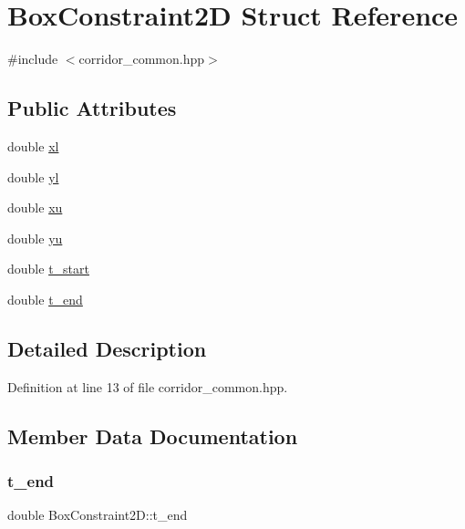 \hypertarget{struct_box_constraint2_d}{}\section{Box\+Constraint2D Struct Reference}
\label{struct_box_constraint2_d}


{\ttfamily \#include $<$corridor\+\_\+common.\+hpp$>$}

\subsection*{Public Attributes}
\begin{DoxyCompactItemize}
\item 
double \hyperlink{struct_box_constraint2_d_a29552a451142588053454d5845c595f3}{xl}
\item 
double \hyperlink{struct_box_constraint2_d_a8ae8a298620374e282506aa35dfd2248}{yl}
\item 
double \hyperlink{struct_box_constraint2_d_a1cf45ba0f8952e0d8b4fba353cc3cfff}{xu}
\item 
double \hyperlink{struct_box_constraint2_d_a250a6cb999ee308cbfe4144afdddb803}{yu}
\item 
double \hyperlink{struct_box_constraint2_d_ad7238545e4f5934bffea66b566514b8d}{t\+\_\+start}
\item 
double \hyperlink{struct_box_constraint2_d_adc1625966c4113bb5980be3db6bd3c6f}{t\+\_\+end}
\end{DoxyCompactItemize}


\subsection{Detailed Description}


Definition at line 13 of file corridor\+\_\+common.\+hpp.



\subsection{Member Data Documentation}
\mbox{\label{struct_box_constraint2_d_adc1625966c4113bb5980be3db6bd3c6f}} 
\subsubsection{\texorpdfstring{t\+\_\+end}{t\_end}}
{\footnotesize\ttfamily double Box\+Constraint2\+D\+::t\+\_\+end}



